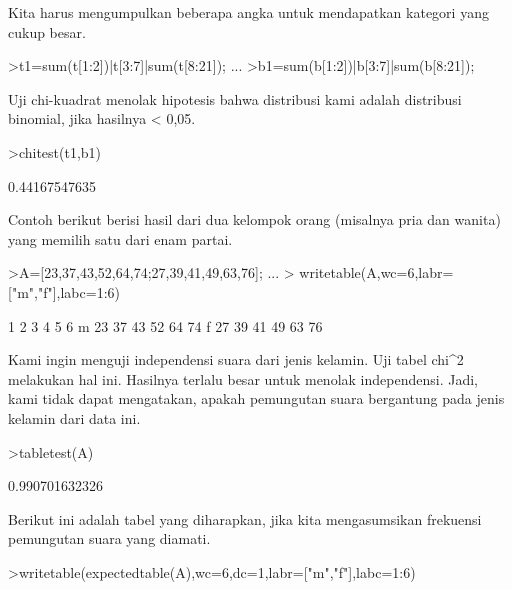 \documentclass[a4paper,10pt]{article}
\begin{document}
\begin{eulernotebook}
\begin{eulercomment}
Kita harus mengumpulkan beberapa angka untuk mendapatkan kategori yang
cukup besar.
\end{eulercomment}
\begin{eulerprompt}
>t1=sum(t[1:2])|t[3:7]|sum(t[8:21]); ...
>b1=sum(b[1:2])|b[3:7]|sum(b[8:21]);
\end{eulerprompt}
\begin{eulercomment}
Uji chi-kuadrat menolak hipotesis bahwa distribusi kami adalah
distribusi binomial, jika hasilnya \textless{} 0,05.
\end{eulercomment}
\begin{eulerprompt}
>chitest(t1,b1)
\end{eulerprompt}
\begin{euleroutput}
  0.44167547635
\end{euleroutput}
\begin{eulercomment}
Contoh berikut berisi hasil dari dua kelompok orang (misalnya pria dan
wanita) yang memilih satu dari enam partai.
\end{eulercomment}
\begin{eulerprompt}
>A=[23,37,43,52,64,74;27,39,41,49,63,76];  ...
>  writetable(A,wc=6,labr=["m","f"],labc=1:6)
\end{eulerprompt}
\begin{euleroutput}
             1     2     3     4     5     6
       m    23    37    43    52    64    74
       f    27    39    41    49    63    76
\end{euleroutput}
\begin{eulercomment}
Kami ingin menguji independensi suara dari jenis kelamin. Uji tabel
chi\textasciicircum{}2 melakukan hal ini. Hasilnya terlalu besar untuk menolak
independensi. Jadi, kami tidak dapat mengatakan, apakah pemungutan
suara bergantung pada jenis kelamin dari data ini.
\end{eulercomment}
\begin{eulerprompt}
>tabletest(A)
\end{eulerprompt}
\begin{euleroutput}
  0.990701632326
\end{euleroutput}
\begin{eulercomment}
Berikut ini adalah tabel yang diharapkan, jika kita mengasumsikan
frekuensi pemungutan suara yang diamati.
\end{eulercomment}
\begin{eulerprompt}
>writetable(expectedtable(A),wc=6,dc=1,labr=["m","f"],labc=1:6)
\end{eulerprompt}

\end{eulernotebook}
\end{document}
